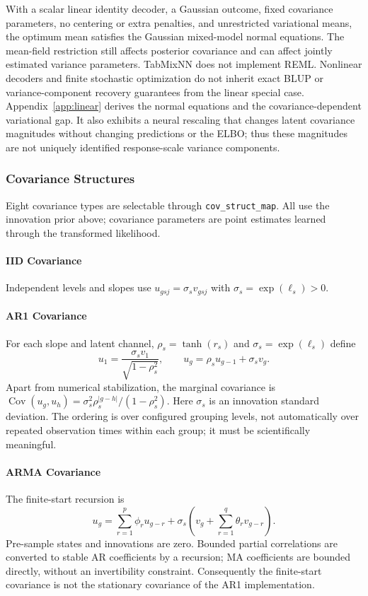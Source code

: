 \documentclass[12pt,a4paper]{article}
\begin{document}
With a scalar linear identity decoder, a Gaussian outcome, fixed covariance parameters, no centering or extra penalties, and unrestricted variational means, the optimum mean satisfies the Gaussian mixed-model normal equations. The mean-field restriction still affects posterior covariance and can affect jointly estimated variance parameters. TabMixNN does not implement REML. Nonlinear decoders and finite stochastic optimization do not inherit exact BLUP or variance-component recovery guarantees from the linear special case. Appendix~\ref{app:linear} derives the normal equations and the covariance-dependent variational gap. It also exhibits a neural rescaling that changes latent covariance magnitudes without changing predictions or the ELBO; thus these magnitudes are not uniquely identified response-scale variance components.

\subsubsection{Covariance Structures}

Eight covariance types are selectable through \texttt{cov\_struct\_map}. All use the innovation prior above; covariance parameters are point estimates learned through the transformed likelihood.

\paragraph{IID Covariance}
Independent levels and slopes use $u_{gsj}=\sigma_s v_{gsj}$ with $\sigma_s=\exp(\ell_s)>0$.

\paragraph{AR1 Covariance}
For each slope and latent channel, $\rho_s=\tanh(r_s)$ and $\sigma_s=\exp(\ell_s)$ define
\begin{equation}
 u_1=\frac{\sigma_s v_1}{\sqrt{1-\rho_s^2}},\qquad
 u_g=\rho_s u_{g-1}+\sigma_s v_g.
\end{equation}
Apart from numerical stabilization, the marginal covariance is
$\operatorname{Cov}(u_g,u_h)=\sigma_s^2\rho_s^{|g-h|}/(1-\rho_s^2)$.
Here $\sigma_s$ is an innovation standard deviation. The ordering is over configured grouping levels, not automatically over repeated observation times within each group; it must be scientifically meaningful.

\paragraph{ARMA Covariance}
The finite-start recursion is
\begin{equation}
 u_g=\sum_{r=1}^{p}\phi_r u_{g-r}
       +\sigma_s\left(v_g+\sum_{r=1}^{q}\theta_r v_{g-r}\right).
\end{equation}
Pre-sample states and innovations are zero. Bounded partial correlations are converted to stable AR coefficients by a recursion; MA coefficients are bounded directly, without an invertibility constraint. Consequently the finite-start covariance is not the stationary covariance of the AR1 implementation.
\end{document}

